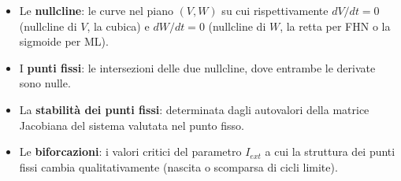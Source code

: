 \begin{itemize}
    \item Le \textbf{nullcline}: le curve nel piano $(V, W)$ su cui rispettivamente $dV/dt = 0$ (nullcline di $V$, la cubica) e $dW/dt = 0$ (nullcline di $W$, la retta per FHN o la sigmoide per ML).
    \item I \textbf{punti fissi}: le intersezioni delle due nullcline, dove entrambe le derivate sono nulle.
    \item La \textbf{stabilità dei punti fissi}: determinata dagli autovalori della matrice Jacobiana del sistema valutata nel punto fisso.
    \item Le \textbf{biforcazioni}: i valori critici del parametro $I_{ext}$ a cui la struttura dei punti fissi cambia qualitativamente (nascita o scomparsa di cicli limite).
\end{itemize}

